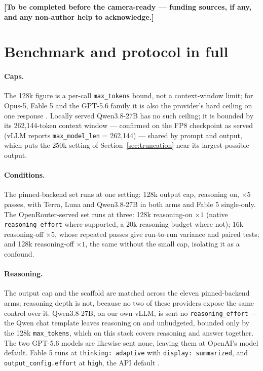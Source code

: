\documentclass{article}
\begin{document}
\textbf{[To be completed before the camera-ready --- funding sources, if any, and any non-author
help to acknowledge.]}
\fi




\appendix

\section{Benchmark and protocol in full}
\label{app:protocol}

\paragraph{Caps.} The 128k figure is a per-call \texttt{max\_tokens} bound, not a context-window
limit; for Opus-5, Fable 5 and the GPT-5.6 family it is also the provider's hard ceiling on one
response \citep{anthropic2026,openai2026}. Locally served Qwen3.8-27B has no such ceiling; it is
bounded by its 262{,}144-token context window \citep{qwen2026c} --- confirmed on the FP8 checkpoint
as served (vLLM reports \texttt{max\_model\_len} = 262{,}144) --- shared by prompt and output,
which puts the 250k setting of Section~\ref{sec:truncation} near its largest possible output.

\paragraph{Conditions.} The pinned-backend set runs at one setting: 128k output cap, reasoning on,
$\times 5$ passes, with Terra, Luna and Qwen3.8-27B in both arms and Fable 5 single-only. The
OpenRouter-served set runs at three: 128k reasoning-on $\times 1$ (native
\texttt{reasoning\_effort} where supported, a 20k reasoning budget where not); 16k reasoning-off
$\times 5$, whose repeated passes give run-to-run variance and paired tests; and 128k reasoning-off
$\times 1$, the same without the small cap, isolating it as a confound.

\paragraph{Reasoning.} The output cap and the scaffold are matched across the eleven pinned-backend
arms; reasoning depth is not, because no two of these providers expose the same control over it.
Qwen3.8-27B, on our own vLLM, is sent no \texttt{reasoning\_effort} --- the Qwen chat template
leaves reasoning on and unbudgeted, bounded only by the 128k \texttt{max\_tokens}, which on this
stack covers reasoning and answer together. The two GPT-5.6 models are likewise sent none, leaving
them at OpenAI's model default. Fable 5 runs at \texttt{thinking: adaptive} with \texttt{display:
summarized}, and \texttt{output\_config.effort} at \texttt{high}, the API default
\citep{anthropic2026effort}.
\end{document}
